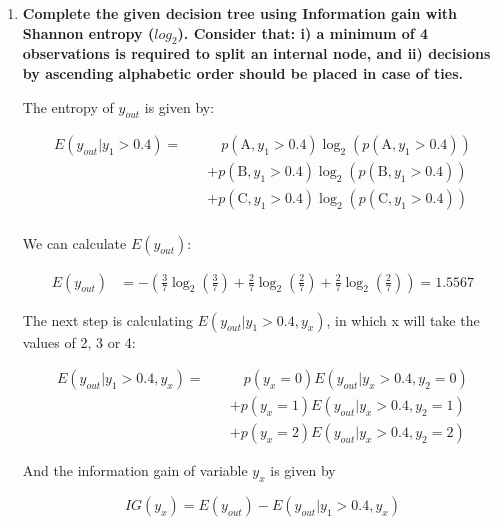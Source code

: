 \documentclass[12pt]{article}
\begin{document}
\begin{enumerate}[leftmargin=\labelsep]
    \item \textbf{Complete the given decision tree using Information gain with Shannon entropy ($log_2$).
    Consider that: i) a minimum of 4 observations is required to split an internal node, and
    ii) decisions by ascending alphabetic order should be placed in case of ties.}

    \vskip 0.3cm
    The entropy of \(y_{out}\) is given by:

    \begin{equation}
        \begin{split}
            E(y_{out} |y_1 > 0.4) = \quad
            & \quad  p(\text{A}, y_1 > 0.4) \log_2 \left(p(\text{A}, y_1 > 0.4)\right)  \\
            & + p(\text{B}, y_1 > 0.4) \log_2 \left(p(\text{B}, y_1 > 0.4)\right) \\
            & + p(\text{C}, y_1 > 0.4) \log_2 \left(p(\text{C}, y_1 > 0.4)\right) \\
        \end{split}
    \end{equation}

    We can calculate $E(y_{out})$:

    \[
        \begin{aligned}
            E(y_{out}) & = - \left(\frac{3}{7} \log_2\left(\frac{3}{7}\right) + \frac{2}{7} \log_2\left(\frac{2}{7}\right)
                            + \frac{2}{7} \log_2\left(\frac{2}{7}\right)\right) = 1.5567
        \end{aligned}
    \]

    The next step is calculating $E(y_{out} | y_1 > 0.4 , y_x)$, in which x will take the values of 2, 3 or 4:

    \begin{equation}\label{exI1-e-yout-y2}
        \begin{split}
            E(y_{out} |y_1 > 0.4 , y_x) = \quad
            & \quad  p(y_x = 0) E(y_{out} | y_x > 0.4 , y_2 = 0) \\
            & + p(y_x = 1) E(y_{out} | y_x > 0.4 , y_2 = 1) \\
            & + p(y_x = 2) E(y_{out} | y_x > 0.4 , y_2 = 2)
        \end{split}
    \end{equation}

    And the information gain of variable $y_x$ is given by

    \begin{equation}\label{ex1-ig}
        IG(y_x) = E(y_{out}) - E(y_{out} |y_1 > 0.4, y_x)
    \end{equation}



\end{enumerate}
\end{document}
